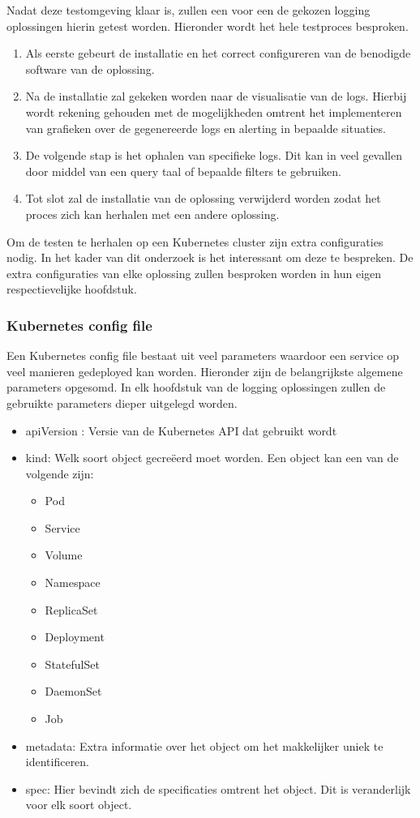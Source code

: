 Nadat deze testomgeving klaar is, zullen een voor een de gekozen logging oplossingen hierin getest worden. Hieronder wordt het hele testproces besproken.
\begin{enumerate}
    \item Als eerste gebeurt de installatie en het correct configureren van de benodigde software van de oplossing. 
    \item Na de installatie zal gekeken worden naar de visualisatie van de logs. Hierbij wordt rekening gehouden met de mogelijkheden omtrent het implementeren van grafieken over de gegenereerde logs en alerting in bepaalde situaties.
    \item De volgende stap is het ophalen van specifieke logs. Dit kan in veel gevallen door middel van een query taal of bepaalde filters te gebruiken.
    \item Tot slot zal de installatie van de oplossing verwijderd worden zodat het proces zich kan herhalen met een andere oplossing.
\end{enumerate}

Om de testen te herhalen op een Kubernetes cluster zijn extra configuraties nodig. In het kader van dit onderzoek is het interessant om deze te bespreken. De extra configuraties van elke oplossing zullen besproken worden in hun eigen respectievelijke hoofdstuk.

\subsubsection{Kubernetes config file}
Een Kubernetes config file bestaat uit veel parameters waardoor een service op veel manieren gedeployed kan worden. Hieronder zijn de belangrijkste algemene parameters opgesomd. In elk hoofdstuk van de logging oplossingen zullen de gebruikte parameters dieper uitgelegd worden.
\begin{itemize}
    \item apiVersion : Versie van de Kubernetes API dat gebruikt wordt
    \item kind: Welk soort object gecreëerd moet worden. Een object kan een van de volgende zijn: \begin{itemize}
        \item Pod
        \item Service
        \item Volume
        \item Namespace
        \item ReplicaSet
        \item Deployment
        \item StatefulSet
        \item DaemonSet
        \item Job
    \end{itemize}
    \item metadata: Extra informatie over het object om het makkelijker uniek te identificeren.
    \item spec: Hier bevindt zich de specificaties omtrent het object. Dit is veranderlijk voor elk soort object.
\end{itemize}

